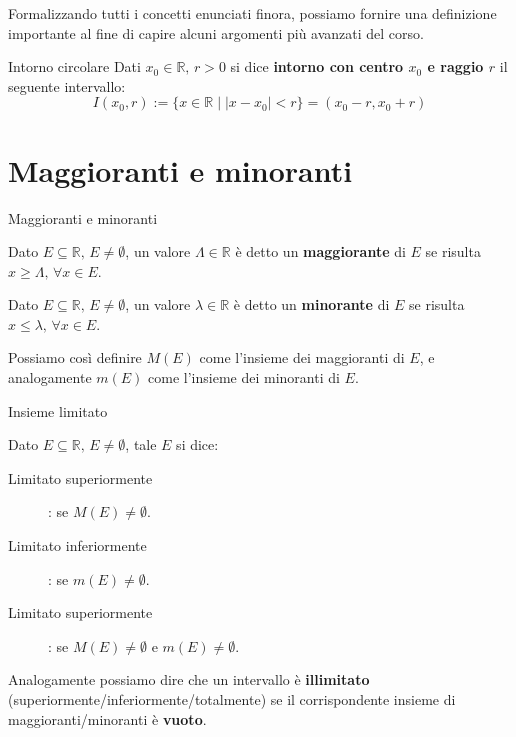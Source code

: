 \documentclass[12pt]{report}
\newcommand{\R}{\mathbb{R}}
\begin{document}
	Formalizzando tutti i concetti enunciati finora, possiamo fornire una definizione importante al fine di capire alcuni argomenti più avanzati del corso.
	\begin{definizione}{Intorno circolare}{}
		Dati $x_0 \in \R,\,r > 0$ si dice \textbf{intorno con centro $x_0$ e raggio $r$} il seguente intervallo:
		\[
			I(x_0, r) := \{x \in \R \mid |x - x_0| < r\} = (x_0 - r, x_0 + r)
		\]
	\end{definizione}
	
	\section{Maggioranti e minoranti}
	\begin{definizione}{Maggioranti e minoranti}{}
		
		Dato $E \subseteq \R,\, E \neq \emptyset$, un valore $\Lambda \in \R$ è detto un \textbf{maggiorante} di $E$ se risulta $x \geq \Lambda,\, \forall x \in E$.\\
		\smallbreak
		
		Dato $E \subseteq \R,\, E \neq \emptyset$, un valore $\lambda \in \R$ è detto un \textbf{minorante} di $E$ se risulta $x \leq \lambda,\, \forall x \in E$.
		
	\end{definizione}
	
	Possiamo così definire $M(E)$ come l'insieme dei maggioranti di $E$, e analogamente $m(E)$ come l'insieme dei minoranti di $E$.
	
	\begin{definizione}{Insieme limitato}{}
		
		Dato $E \subseteq \R,\, E \neq \emptyset$, tale $E$ si dice:
		\begin{description}
			
			\item [Limitato superiormente]: se $M(E) \neq \emptyset$.
			
			\item [Limitato inferiormente]: se $m(E) \neq \emptyset$.
			
			\item [Limitato superiormente]: se $M(E) \neq \emptyset$ e $m(E) \neq \emptyset$.
			
		\end{description}
		
		Analogamente possiamo dire che un intervallo è \textbf{illimitato} (superiormente/inferiormente/totalmente) se il corrispondente insieme di maggioranti/minoranti è \textbf{vuoto}.
		
	\end{definizione}
\end{document}
